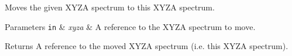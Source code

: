 Moves the given X\+Y\+ZA spectrum to this X\+Y\+ZA spectrum.


\begin{DoxyParams}[1]{Parameters}
\mbox{\tt in}  & {\em xyza} & A reference to the X\+Y\+ZA spectrum to move. \\
\hline
\end{DoxyParams}
\begin{DoxyReturn}{Returns}
A reference to the moved X\+Y\+ZA spectrum (i.\+e. this X\+Y\+ZA spectrum). 
\end{DoxyReturn}
